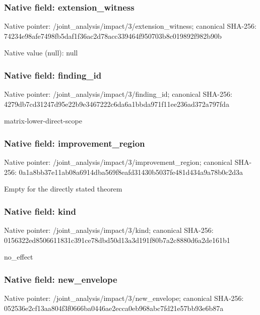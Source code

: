 \documentclass[10pt,a4paper]{article}
\begin{document}
\subsubsection{Native field: extension\_\allowbreak{}witness}
Native pointer: /joint\_\allowbreak{}analysis/impact/3/extension\_\allowbreak{}witness; canonical SHA-256: 74234e98afe7498fb5daf1f36ac2d78acc339464f950703b8c019892f982b90b

Native value (null): null

\subsubsection{Native field: finding\_\allowbreak{}id}
Native pointer: /joint\_\allowbreak{}analysis/impact/3/finding\_\allowbreak{}id; canonical SHA-256: 4279db7cd31247d95e22b9e3467222c6da6a1bbda971f11ee236ad372a797fda

\begingroup\raggedright\sloppy matrix-lower-direct-scope\par\endgroup

\subsubsection{Native field: improvement\_\allowbreak{}region}
Native pointer: /joint\_\allowbreak{}analysis/impact/3/improvement\_\allowbreak{}region; canonical SHA-256: 0a1a8bb37e11ab08a6914dba569f8eafd31430b5037fe481d434a9a78b0c2d3a

\begingroup\raggedright\sloppy Empty for the directly stated theorem\par\endgroup

\subsubsection{Native field: kind}
Native pointer: /joint\_\allowbreak{}analysis/impact/3/kind; canonical SHA-256: 0156322ed8506611831c391ce78dbd50d13a3d191f80b7a2c8880d6a2de161b1

\begingroup\raggedright\sloppy no\_\allowbreak{}effect\par\endgroup

\subsubsection{Native field: new\_\allowbreak{}envelope}
Native pointer: /joint\_\allowbreak{}analysis/impact/3/new\_\allowbreak{}envelope; canonical SHA-256: 052536e2cf13aa804f3f0666ba0446ae2ecca0eb968abc7fd21e57bb93e6b87a
\end{document}
